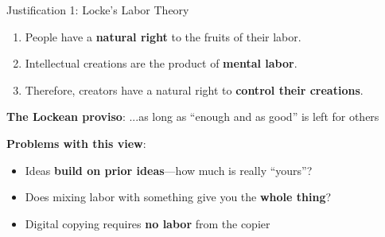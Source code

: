 \documentclass[aspectratio=169]{beamer}
\begin{document}
\begin{frame}{Justification 1: Locke's Labor Theory}
\begin{argumentbox}
\begin{enumerate}
    \item People have a \textbf{natural right} to the fruits of their labor.
    \item Intellectual creations are the product of \textbf{mental labor}.
    \item Therefore, creators have a natural right to \textbf{control their creations}.
\end{enumerate}
\end{argumentbox}

\vspace{0.3cm}
\textbf{The Lockean proviso}: ...as long as ``enough and as good'' is left for others

\vspace{0.3cm}
\textbf{Problems with this view}:
\begin{itemize}
    \item Ideas \textbf{build on prior ideas}---how much is really ``yours''?
    \item Does mixing labor with something give you the \textbf{whole thing}?
    \item Digital copying requires \textbf{no labor} from the copier
\end{itemize}
\end{frame}
\end{document}
